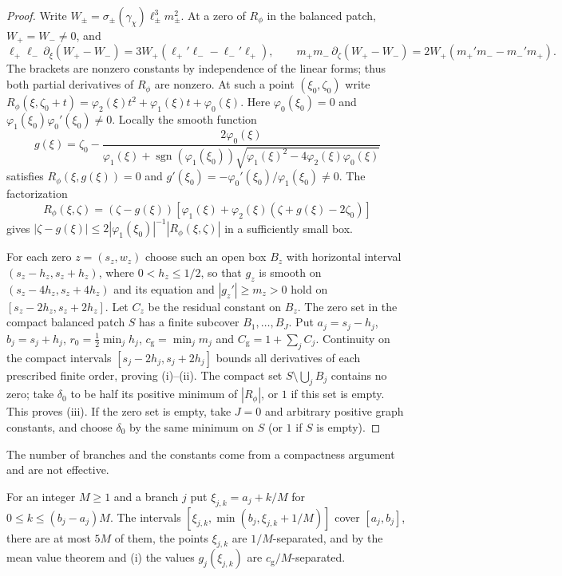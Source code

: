 \documentclass[11pt,reqno]{amsart}
\theoremstyle{definition}
\theoremstyle{remark}
\numberwithin{equation}{section}
\begin{document}
\begin{proof}
Write $W_\pm=\sigma_\pm(\gamma_\chi)\ell_\pm^3m_\pm^2$.
At a zero of $R_\phi$ in the balanced patch, $W_+=W_-\ne0$, and
\[
 \ell_+\ell_-\,\partial_\xi(W_+-W_-)=3W_+(\ell_+'\ell_--\ell_-'\ell_+),\qquad
 m_+m_-\,\partial_\zeta(W_+-W_-)=2W_+(m_+'m_--m_-'m_+).
\]
The brackets are nonzero constants by independence of the linear
forms; thus both partial derivatives of $R_\phi$ are nonzero.
At such a point $(\xi_0,\zeta_0)$ write
$R_\phi(\xi,\zeta_0+t)=\varphi_2(\xi)t^2+\varphi_1(\xi)t+\varphi_0(\xi)$.
Here $\varphi_0(\xi_0)=0$ and
$\varphi_1(\xi_0)\varphi_0'(\xi_0)\ne0$. Locally the smooth function
\[
 g(\xi)=\zeta_0-
 \frac{2\varphi_0(\xi)}{\varphi_1(\xi)+\operatorname{sgn}(\varphi_1(\xi_0))
 \sqrt{\varphi_1(\xi)^2-4\varphi_2(\xi)\varphi_0(\xi)}}
\]
satisfies $R_\phi(\xi,g(\xi))=0$ and
$g'(\xi_0)=-\varphi_0'(\xi_0)/\varphi_1(\xi_0)\ne0$.
The factorization
\[
 R_\phi(\xi,\zeta)=(\zeta-g(\xi))
 [\varphi_1(\xi)+\varphi_2(\xi)(\zeta+g(\xi)-2\zeta_0)]
\]
gives $|\zeta-g(\xi)|\le2|\varphi_1(\xi_0)|^{-1}|R_\phi(\xi,\zeta)|$
in a sufficiently small box.

For each zero $z=(s_z,w_z)$ choose such an open box $B_z$ with horizontal
interval $(s_z-h_z,s_z+h_z)$, where $0<h_z\le1/2$, so that $g_z$ is
smooth on $(s_z-4h_z,s_z+4h_z)$ and its equation and
$|g_z'|\ge m_z>0$ hold on $[s_z-2h_z,s_z+2h_z]$.
Let $C_z$ be the residual constant on $B_z$.
The zero set in the compact balanced patch $S$ has a finite subcover
$B_1,\ldots,B_J$. Put $a_j=s_j-h_j$, $b_j=s_j+h_j$,
$r_0=\frac12\min_jh_j$, $c_{\mathrm g}=\min_jm_j$ and
$C_{\mathrm g}=1+\sum_jC_j$. Continuity on the compact intervals
$[s_j-2h_j,s_j+2h_j]$ bounds all derivatives of each prescribed finite
order, proving (i)--(ii). The compact set $S\setminus\bigcup_jB_j$
contains no zero; take $\delta_0$ to be half its positive minimum of
$|R_\phi|$, or $1$ if this set is empty. This proves (iii).
If the zero set is empty, take $J=0$ and arbitrary positive graph
constants, and choose $\delta_0$ by the same minimum on $S$ (or $1$
if $S$ is empty).
\end{proof}
The number of branches and the constants come from a compactness argument
and are not effective.

For an integer $M\ge1$ and a branch $j$ put $\xi_{j,k}=a_j+k/M$ for
$0\le k\le(b_j-a_j)M$. The intervals $[\xi_{j,k},\min(b_j,\xi_{j,k}+1/M)]$
cover $[a_j,b_j]$, there are at most $5M$ of them, the points $\xi_{j,k}$
are $1/M$-separated, and by the mean value theorem and (i) the values
$g_j(\xi_{j,k})$ are $c_{\mathrm g}/M$-separated.
\end{document}
